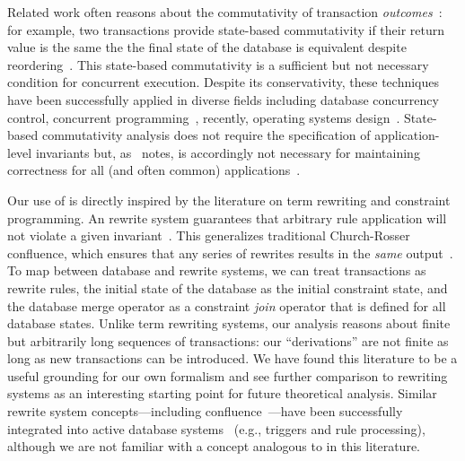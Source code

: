 Related work often reasons about
the commutativity of transaction \textit{outcomes}~\cite{boosting}:
for example, two transactions provide state-based commutativity if
their return value is the same the the final state of the database is
equivalent despite reordering~\cite{weihl-data,weihl-thesis}. This
state-based commutativity is a sufficient but not necessary condition
for concurrent execution. Despite its conservativity, these techniques
have been successfully applied in diverse fields including database
concurrency control, concurrent programming~\cite{boosting}, recently,
operating systems design~\cite{kohler-commutativity}. State-based
commutativity analysis does not require the specification of
application-level invariants but, as~\cite{kohler-commutativity}
notes, is accordingly not necessary for maintaining correctness for
all (and often common) applications~\cite{lamport-audit}.

 Our use of \iconfluence is directly inspired
by the literature on term rewriting and constraint programming. An
\iconfluent rewrite system guarantees that arbitrary rule application
will not violate a given invariant~\cite{obs-confluence}. This
generalizes traditional Church-Rosser confluence, which ensures that
any series of rewrites results in the \textit{same}
output~\cite{termrewriting}. To map between database and rewrite
systems, we can treat transactions as rewrite rules, the initial state
of the database as the initial constraint state, and the database
merge operator as a constraint \textit{join} operator that is defined
for all database states. Unlike term rewriting systems, our \cfreedom
analysis reasons about finite but arbitrarily long sequences of
transactions: our ``derivations'' are not finite as long as new
transactions can be introduced. We have found this literature to be a
useful grounding for our own formalism and see further comparison to
rewriting systems as an interesting starting point for future
theoretical analysis. Similar rewrite system concepts---including
confluence~\cite{aiken-confluence}---have been successfully integrated
into active database systems~\cite{activedb-book} (e.g., triggers and
rule processing), although we are not familiar with a concept
analogous to \iconfluence in this literature.


